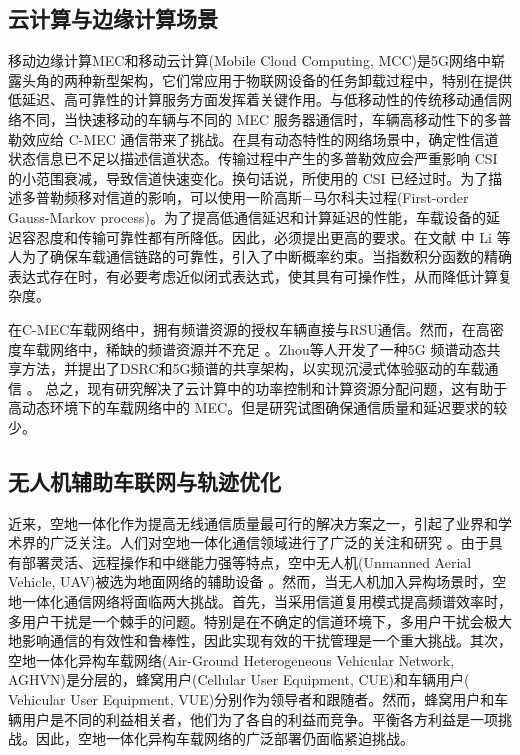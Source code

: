 \subsection{云计算与边缘计算场景}\label{section1-2-2}
移动边缘计算MEC和移动云计算(Mobile Cloud Computing, MCC)是5G网络中崭露头角的两种新型架构，它们常应用于物联网设备的任务卸载过程中，特别在提供低延迟、高可靠性的计算服务方面发挥着关键作用。与低移动性的传统移动通信网络不同，当快速移动的车辆与不同的 MEC 服务器通信时，车辆高移动性下的多普勒效应给 C-MEC 通信带来了挑战。在具有动态特性的网络场景中，确定性信道状态信息已不足以描述信道状态。传输过程中产生的多普勒效应会严重影响 CSI 的小范围衰减，导致信道快速变化。换句话说，所使用的 CSI 已经过时。为了描述多普勒频移对信道的影响，可以使用一阶高斯$-$马尔科夫过程(First-order Gauss-Markov process)\supercite{CCO}。为了提高低通信延迟和计算延迟的性能，车载设备的延迟容忍度和传输可靠性都有所降低。因此，必须提出更高的要求。在文献 \cite{Li2020} 中 Li 等人为了确保车载通信链路的可靠性，引入了中断概率约束。当指数积分函数的精确表达式存在时，有必要考虑近似闭式表达式，使其具有可操作性，从而降低计算复杂度。

在C-MEC车载网络中，拥有频谱资源的授权车辆直接与RSU通信。然而，在高密度车载网络中，稀缺的频谱资源并不充足 \supercite{Xie2020}。Zhou等人开发了一种5G 频谱动态共享方法，并提出了DSRC和5G频谱的共享架构，以实现沉浸式体验驱动的车载通信 \supercite{Zhou2017}。 总之，现有研究解决了云计算中的功率控制和计算资源分配问题，这有助于高动态环境下的车载网络中的 MEC。但是研究试图确保通信质量和延迟要求的较少。
\subsection{无人机辅助车联网与轨迹优化}\label{section1-2-3}
近来，空地一体化作为提高无线通信质量最可行的解决方案之一，引起了业界和学术界的广泛关注。人们对空地一体化通信领域进行了广泛的关注和研究 \supercite{OUC,SDR,UAV10403831}。由于具有部署灵活、远程操作和中继能力强等特点，空中无人机(Unmanned Aerial Vehicle, UAV)被选为地面网络的辅助设备 \supercite{ACO}。然而，当无人机加入异构场景时，空地一体化通信网络将面临两大挑战。首先，当采用信道复用模式提高频谱效率时，多用户干扰是一个棘手的问题。特别是在不确定的信道环境下，多用户干扰会极大地影响通信的有效性和鲁棒性，因此实现有效的干扰管理是一个重大挑战。其次，空地一体化异构车载网络(Air-Ground Heterogeneous Vehicular Network, AGHVN)是分层的，蜂窝用户(Cellular User Equipment, CUE)和车辆用户( Vehicular User Equipment, VUE)分别作为领导者和跟随者。然而，蜂窝用户和车辆用户是不同的利益相关者，他们为了各自的利益而竞争。平衡各方利益是一项挑战。因此，空地一体化异构车载网络的广泛部署仍面临紧迫挑战。


